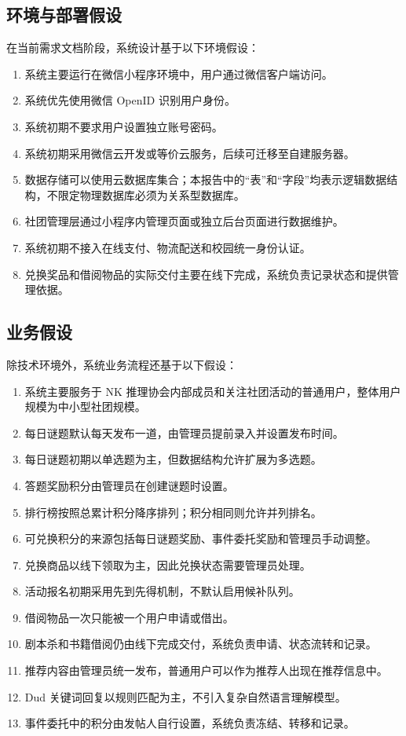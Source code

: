 \documentclass[a4paper,12pt]{article}
\begin{document}
\subsection{环境与部署假设}

在当前需求文档阶段，系统设计基于以下环境假设：

\begin{enumerate}
    \item 系统主要运行在微信小程序环境中，用户通过微信客户端访问。
    \item 系统优先使用微信 OpenID 识别用户身份。
    \item 系统初期不要求用户设置独立账号密码。
    \item 系统初期采用微信云开发或等价云服务，后续可迁移至自建服务器。
    \item 数据存储可以使用云数据库集合；本报告中的“表”和“字段”均表示逻辑数据结构，不限定物理数据库必须为关系型数据库。
    \item 社团管理层通过小程序内管理页面或独立后台页面进行数据维护。
    \item 系统初期不接入在线支付、物流配送和校园统一身份认证。
    \item 兑换奖品和借阅物品的实际交付主要在线下完成，系统负责记录状态和提供管理依据。
\end{enumerate}

\subsection{业务假设}

除技术环境外，系统业务流程还基于以下假设：

\begin{enumerate}
    \item 系统主要服务于 NK 推理协会内部成员和关注社团活动的普通用户，整体用户规模为中小型社团规模。
    \item 每日谜题默认每天发布一道，由管理员提前录入并设置发布时间。
    \item 每日谜题初期以单选题为主，但数据结构允许扩展为多选题。
    \item 答题奖励积分由管理员在创建谜题时设置。
    \item 排行榜按照总累计积分降序排列；积分相同则允许并列排名。
    \item 可兑换积分的来源包括每日谜题奖励、事件委托奖励和管理员手动调整。
    \item 兑换商品以线下领取为主，因此兑换状态需要管理员处理。
    \item 活动报名初期采用先到先得机制，不默认启用候补队列。
    \item 借阅物品一次只能被一个用户申请或借出。
    \item 剧本杀和书籍借阅仍由线下完成交付，系统负责申请、状态流转和记录。
    \item 推荐内容由管理员统一发布，普通用户可以作为推荐人出现在推荐信息中。
    \item Dud 关键词回复以规则匹配为主，不引入复杂自然语言理解模型。
    \item 事件委托中的积分由发帖人自行设置，系统负责冻结、转移和记录。
\end{enumerate}
\end{document}
